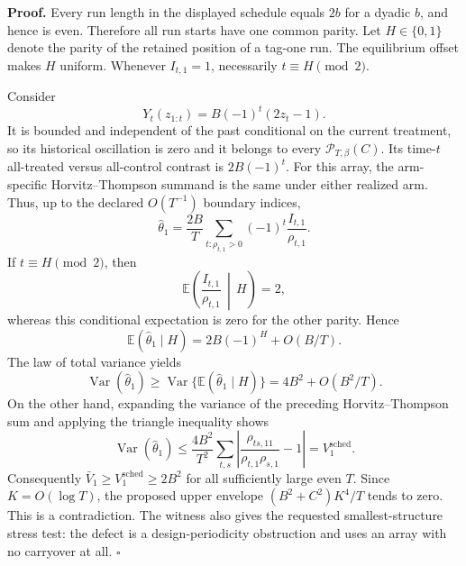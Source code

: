 \textbf{Proof.} Every run length in the displayed schedule equals \(2b\) for a dyadic \(b\), and hence is even. Therefore all run starts have one common parity. Let \(H\in\{0,1\}\) denote the parity of the retained position of a tag-one run. The equilibrium offset makes \(H\) uniform. Whenever \(I_{t,1}=1\), necessarily \(t\equiv H\pmod2\).

Consider
\[
Y_t(z_{1:t})=B(-1)^t(2z_t-1).
\]
It is bounded and independent of the past conditional on the current treatment, so its historical oscillation is zero and it belongs to every \(\mathcal P_{T,\beta}(C)\). Its time-\(t\) all-treated versus all-control contrast is \(2B(-1)^t\). For this array, the arm-specific Horvitz--Thompson summand is the same under either realized arm. Thus, up to the declared \(O(T^{-1})\) boundary indices,
\[
\widehat\theta_1
=\frac{2B}{T}\sum_{t:\rho_{t,1}>0}
(-1)^t\frac{I_{t,1}}{\rho_{t,1}}.
\]
If \(t\equiv H\pmod2\), then
\[
\mathbb E\!\left(\frac{I_{t,1}}{\rho_{t,1}}\,\middle|\,H\right)=2,
\]
whereas this conditional expectation is zero for the other parity. Hence
\[
\mathbb E(\widehat\theta_1\mid H)
=2B(-1)^H+O(B/T).
\]
The law of total variance yields
\[
\operatorname{Var}(\widehat\theta_1)
\ge \operatorname{Var}\{\mathbb E(\widehat\theta_1\mid H)\}
=4B^2+O(B^2/T).
\]
On the other hand, expanding the variance of the preceding Horvitz--Thompson sum and applying the triangle inequality shows
\[
\operatorname{Var}(\widehat\theta_1)
\le \frac{4B^2}{T^2}
\sum_{t,s}
\left|\frac{\rho_{ts,11}}{\rho_{t,1}\rho_{s,1}}-1\right|
=V_1^{\mathrm{sched}}.
\]
Consequently \(\bar V_1\ge V_1^{\mathrm{sched}}\ge 2B^2\) for all sufficiently large even \(T\). Since \(K=O(\log T)\), the proposed upper envelope \((B^2+C^2)K^4/T\) tends to zero. This is a contradiction. The witness also gives the requested smallest-structure stress test: the defect is a design-periodicity obstruction and uses an array with no carryover at all. \(\square\)
